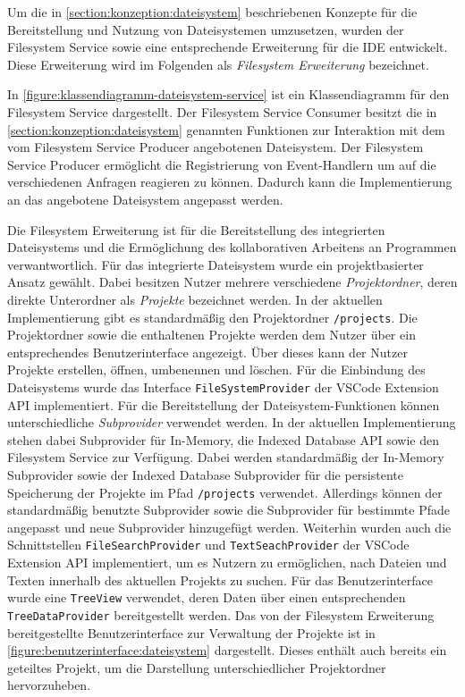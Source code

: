 Um die in \autoref{section:konzeption:dateisystem} beschriebenen Konzepte für die Bereitstellung und Nutzung von Dateisystemen umzusetzen, wurden der Filesystem Service sowie eine entsprechende Erweiterung für die IDE entwickelt. Diese Erweiterung wird im Folgenden als \textit{Filesystem Erweiterung} bezeichnet.

In \autoref{figure:klassendiagramm-dateisystem-service} ist ein Klassendiagramm für den Filesystem Service dargestellt. Der Filesystem Service Consumer besitzt die in \autoref{section:konzeption:dateisystem} genannten Funktionen zur Interaktion mit dem vom Filesystem Service Producer angebotenen Dateisystem. Der Filesystem Service Producer ermöglicht die Registrierung von Event-Handlern um auf die verschiedenen Anfragen reagieren zu können. Dadurch kann die Implementierung an das angebotene Dateisystem angepasst werden.

Die Filesystem Erweiterung ist für die Bereitstellung des integrierten Dateisystems und die Ermöglichung des kollaborativen Arbeitens an Programmen verwantwortlich. Für das integrierte Dateisystem wurde ein projektbasierter Ansatz gewählt. Dabei besitzen Nutzer mehrere verschiedene \textit{Projektordner}, deren direkte Unterordner als \textit{Projekte} bezeichnet werden. In der aktuellen Implementierung gibt es standardmäßig den Projektordner \texttt{/projects}. Die Projektordner sowie die enthaltenen Projekte werden dem Nutzer über ein entsprechendes Benutzerinterface angezeigt. Über dieses kann der Nutzer Projekte erstellen, öffnen, umbenennen und löschen. Für die Einbindung des Dateisystems wurde das Interface \texttt{FileSystemProvider} der VSCode Extension API implementiert. Für die Bereitstellung der Dateisystem-Funktionen können unterschiedliche \textit{Subprovider} verwendet werden. In der aktuellen Implementierung stehen dabei Subprovider für In-Memory, die Indexed Database API sowie den Filesystem Service zur Verfügung. Dabei werden standardmäßig der In-Memory Subprovider sowie der Indexed Database Subprovider für die persistente Speicherung der Projekte im Pfad \texttt{/projects} verwendet. Allerdings können der standardmäßig benutzte Subprovider sowie die Subprovider für bestimmte Pfade angepasst und neue Subprovider hinzugefügt werden. Weiterhin wurden auch die Schnittstellen \texttt{FileSearchProvider} und \texttt{TextSeachProvider} der VSCode Extension API implementiert, um es Nutzern zu ermöglichen, nach Dateien und Texten innerhalb des aktuellen Projekts zu suchen. Für das Benutzerinterface wurde eine \texttt{TreeView} verwendet, deren Daten über einen entsprechenden \texttt{TreeDataProvider} bereitgestellt werden. Das von der Filesystem Erweiterung bereitgestellte Benutzerinterface zur Verwaltung der Projekte ist in \autoref{figure:benutzerinterface:dateisystem} dargestellt. Dieses enthält auch bereits ein geteiltes Projekt, um die Darstellung unterschiedlicher Projektordner hervorzuheben.

